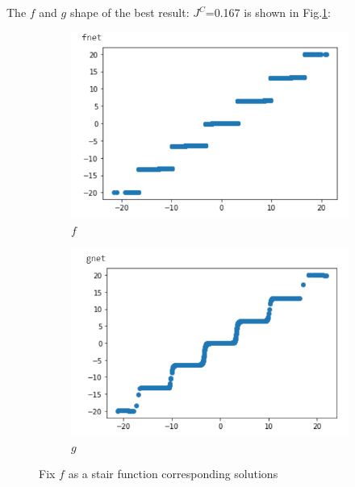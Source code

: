 \documentclass[conference,compsoc]{IEEEtran}
\begin{document}
    The $f$ and $g$ shape of the best result: $J^C$=0.167 is shown in Fig.\ref{fig:fixedFfunction}:

    \begin{figure}
      \centering
          \begin{subfigure}[b]{0.2\textwidth}            
                  \includegraphics[width=\textwidth]{images/fixedFfunction.png}
                  \caption{$f$}
          \end{subfigure}%
          \begin{subfigure}[b]{0.2\textwidth}
                  \centering
                  \includegraphics[width=\textwidth]{images/g_fixedFfunction.png}
                  \caption{$g$}
          \end{subfigure}
          \caption{Fix $f$ as a stair function corresponding solutions}
          \label{fig:fixedFfunction}
      \end{figure}
  
\end{document}
